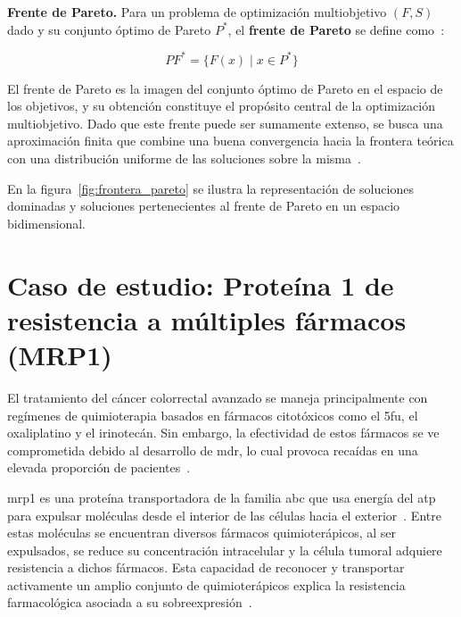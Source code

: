 \textbf{Frente de Pareto.} Para un problema de optimización multiobjetivo $(F, S)$ dado y su conjunto óptimo de Pareto $P^*$, el \textbf{frente de Pareto} se define como~\cite{talbi2009metaheuristics}:

\begin{equation}
\label{eq:frente_pareto}
PF^* = \{F(x) \mid x \in P^*\}
\end{equation}

El frente de Pareto es la imagen del conjunto óptimo de Pareto en el espacio de los objetivos, y su obtención constituye el propósito central de la optimización multiobjetivo. Dado que este frente puede ser sumamente extenso, se busca una aproximación finita que combine una buena convergencia hacia la frontera teórica con una distribución uniforme de las soluciones sobre la misma~\cite{talbi2009metaheuristics}.

En la figura~\ref{fig:frontera_pareto} se ilustra la representación de soluciones dominadas y soluciones pertenecientes al frente de Pareto en un espacio bidimensional.




\section{Caso de estudio: Proteína 1 de resistencia a múltiples fármacos (MRP1)}
\label{sec:mrp1}

El tratamiento del cáncer colorrectal avanzado se maneja principalmente con regímenes de quimioterapia basados en fármacos citotóxicos como el \gls{5fu}, el oxaliplatino y el irinotecán. Sin embargo, la efectividad de estos fármacos se ve comprometida debido al desarrollo de \gls{mdr}, lo cual provoca recaídas en una elevada proporción de pacientes~\cite{abdallah2016, marin2022expression}.

\Gls{mrp1} es una proteína transportadora de la familia \gls{abc} que usa energía del \gls{atp} para expulsar moléculas desde el interior de las células hacia el exterior~\cite{cole_targeting_2014, lu_mrp1_2015}. Entre estas moléculas se encuentran diversos fármacos quimioterápicos, al ser expulsados, se reduce su concentración intracelular y la célula tumoral adquiere resistencia a dichos fármacos. Esta capacidad de reconocer y transportar activamente un amplio conjunto de quimioterápicos explica la resistencia farmacológica asociada a su sobreexpresión~\cite{cole_targeting_2014, lu_mrp1_2015}.

